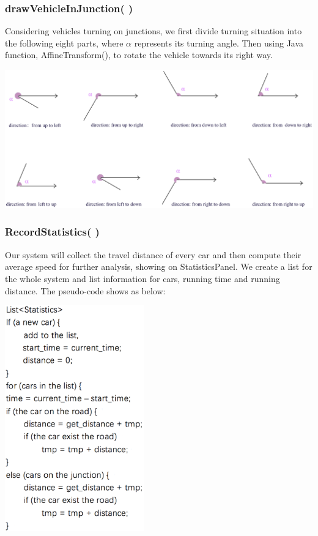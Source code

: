 \documentclass[a4paper,12pt]{article}
\begin{document}
\subsubsection{drawVehicleInJunction( )}
Considering vehicles turning on junctions, we first divide turning situation into the following eight parts, where $\alpha$ represents its turning angle. Then using Java function, AffineTransform(), to rotate the vehicle towards its right way.
\begin{center}
	\includegraphics[width=14cm]{GUI_p1.eps}
\end{center}

\subsubsection{RecordStatistics( )}
Our system will collect the travel distance of every car and then compute their average speed for further analysis, showing on StatisticsPanel. We create a list for the whole system and list information for cars, running time and running distance. The pseudo-code shows as below:
\begin{center}
	\includegraphics[width=6cm] {GUI_p2.eps}
\end{center}
\end{document}

